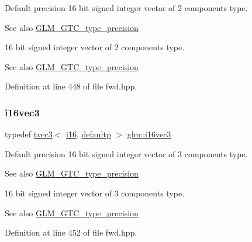 Default precision 16 bit signed integer vector of 2 components type. \begin{DoxySeeAlso}{See also}
\mbox{\hyperlink{group__gtc__type__precision}{G\+L\+M\+\_\+\+G\+T\+C\+\_\+type\+\_\+precision}}
\end{DoxySeeAlso}
16 bit signed integer vector of 2 components type. \begin{DoxySeeAlso}{See also}
\mbox{\hyperlink{group__gtc__type__precision}{G\+L\+M\+\_\+\+G\+T\+C\+\_\+type\+\_\+precision}} 
\end{DoxySeeAlso}


Definition at line 448 of file fwd.\+hpp.

\mbox{\label{group__gtc__type__precision_ga85e903f028d903b416a1119b00af57ea}} 
\subsubsection{\texorpdfstring{i16vec3}{i16vec3}}
{\footnotesize\ttfamily typedef \mbox{\hyperlink{structglm_1_1tvec3}{tvec3}}$<$ \mbox{\hyperlink{group__gtc__type__precision_ga35e5542ca05b29cc256fdafb8503d1fd}{i16}}, \mbox{\hyperlink{namespaceglm_a0f04f086094c747d227af4425893f545a9d21ccd8b5a009ec7eb7677befc3bf51}{defaultp}} $>$ \mbox{\hyperlink{group__gtc__type__precision_ga85e903f028d903b416a1119b00af57ea}{glm\+::i16vec3}}}

Default precision 16 bit signed integer vector of 3 components type. \begin{DoxySeeAlso}{See also}
\mbox{\hyperlink{group__gtc__type__precision}{G\+L\+M\+\_\+\+G\+T\+C\+\_\+type\+\_\+precision}}
\end{DoxySeeAlso}
16 bit signed integer vector of 3 components type. \begin{DoxySeeAlso}{See also}
\mbox{\hyperlink{group__gtc__type__precision}{G\+L\+M\+\_\+\+G\+T\+C\+\_\+type\+\_\+precision}} 
\end{DoxySeeAlso}


Definition at line 452 of file fwd.\+hpp.

\mbox{\label{group__gtc__type__precision_gaf074450c0e60b45114084b1df4012a1d}} 

